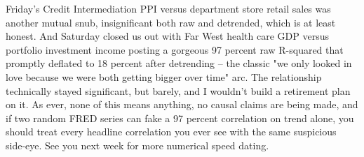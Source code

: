 Friday's Credit Intermediation PPI versus department store retail sales was another mutual snub, insignificant both raw and detrended, which is at least honest. And Saturday closed us out with Far West health care GDP versus portfolio investment income posting a gorgeous 97 percent raw R-squared that promptly deflated to 18 percent after detrending -- the classic "we only looked in love because we were both getting bigger over time" arc. The relationship technically stayed significant, but barely, and I wouldn't build a retirement plan on it. As ever, none of this means anything, no causal claims are being made, and if two random FRED series can fake a 97 percent correlation on trend alone, you should treat every headline correlation you ever see with the same suspicious side-eye. See you next week for more numerical speed dating.
